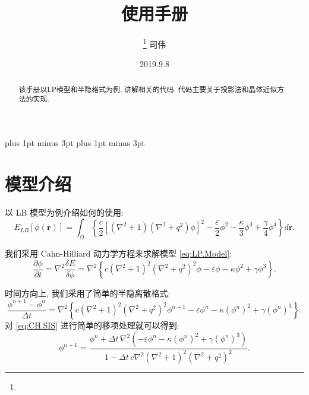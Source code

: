 \documentclass[12pt]{article}
\newcommand{\br}{\mathbf{r}}
\numberwithin{equation}{section}
\begin{document}
\begin{CJK}{UTF8}{gkai}
\abovedisplayskip=5.8pt plus 1pt minus 3pt
\belowdisplayskip=5.8pt plus 1pt minus 3pt
\renewcommand{\sectionmark}[1]{\markright{~\thesection~~ #1~}{}}

\noindent

\baselineskip 18pt

\title{ 使用手册 }

\author{\footnote{}  司伟 }

\date{2019.9.8}

\maketitle
{}

\tableofcontents
\newpage

\begin{abstract}
	该手册以LP模型和半隐格式为例, 讲解相关的代码.
	代码主要关于投影法和晶体近似方法的实现.
\end{abstract}

\section{模型介绍}
\label{sec:Model.Intr}

以 LB 模型为例介绍如何的使用:
\begin{equation}
	E_{LB}[\phi(\br)] = \int_{\Omega} \left\{ \frac{c}{2} \left[ (\nabla^{2}+1) (\nabla^{2}+q^{2}) \phi \right]^{2} - \frac{\varepsilon}{2} \phi^{2} - \frac{\kappa}{3} \phi^{3} + \frac{\gamma}{4} \phi^{4} \right\} d\br.
	\label{eq:LP.Model}
\end{equation}

我们采用 Cahn-Hilliard 动力学方程来求解模型 \eqref{eq:LP.Model}:
\begin{equation}
	\frac{\partial\phi}{\partial t} = \nabla^{2} \frac{\delta E}{\delta\phi} = \nabla^{2} \left\{ c (\nabla^{2}+1)^{2} (\nabla^{2}+q^{2})^{2} \phi - \varepsilon \phi - \kappa \phi^{2} + \gamma \phi^{3} \right\}.
	\label{eq:CH}
\end{equation}

时间方向上, 我们采用了简单的半隐离散格式:
\begin{equation}
	\frac{\phi^{n+1} - \phi^{n}}{\Delta t} = \nabla^{2} \left\{ c (\nabla^{2}+1)^{2} (\nabla^{2}+q^{2})^{2} \phi^{n+1} - \varepsilon \phi^{n} - \kappa (\phi^{n})^{2} + \gamma (\phi^{n})^{3} \right\}.
	\label{eq:CH.SIS}
\end{equation}
对 \eqref{eq:CH.SIS} 进行简单的移项处理就可以得到:
\begin{equation}
	\phi^{n+1} = \frac{ \phi^{n} + \Delta t \, \nabla^{2} \left( -\varepsilon \phi^{n} - \kappa (\phi^{n})^{2} + \gamma (\phi^{n})^{3} \right) }{ 1 - \Delta t \, c \nabla^{2} (\nabla^{2}+1)^{2} (\nabla^{2}+q^{2})^{2} }.
	\label{eq:CH.SIS.phi}
\end{equation}



\end{CJK}
\end{document}
